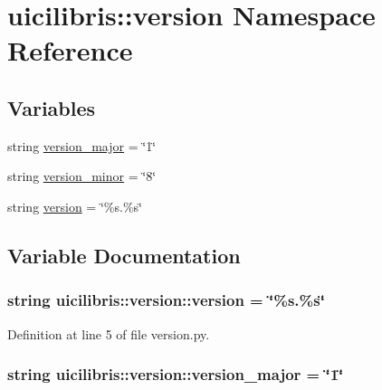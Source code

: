 \hypertarget{namespaceuicilibris_1_1version}{\section{uicilibris\-:\-:version \-Namespace \-Reference}
\label{namespaceuicilibris_1_1version}
}
\subsection*{\-Variables}
\begin{DoxyCompactItemize}
\item 
string \hyperlink{namespaceuicilibris_1_1version_a4b02363ec60fae0cb9598fa91b308e1a}{version\-\_\-major} = \char`\"{}1\char`\"{}
\item 
string \hyperlink{namespaceuicilibris_1_1version_abebe26f12f2b7b3aa2ed3878c6b4848d}{version\-\_\-minor} = \char`\"{}8\char`\"{}
\item 
string \hyperlink{namespaceuicilibris_1_1version_aa28b7695ab2f52dc9b4cb3027d3d6543}{version} = \char`\"{}\%s.\%s\char`\"{}
\end{DoxyCompactItemize}


\subsection{\-Variable \-Documentation}
\hypertarget{namespaceuicilibris_1_1version_aa28b7695ab2f52dc9b4cb3027d3d6543}{
\subsubsection[{version}]{\setlength{\rightskip}{0pt plus 5cm}string {\bf uicilibris\-::version\-::version} = \char`\"{}\%s.\%s\char`\"{}}}\label{namespaceuicilibris_1_1version_aa28b7695ab2f52dc9b4cb3027d3d6543}


\-Definition at line 5 of file version.\-py.

\hypertarget{namespaceuicilibris_1_1version_a4b02363ec60fae0cb9598fa91b308e1a}{
\subsubsection[{version\-\_\-major}]{\setlength{\rightskip}{0pt plus 5cm}string {\bf uicilibris\-::version\-::version\-\_\-major} = \char`\"{}1\char`\"{}}}\label{namespaceuicilibris_1_1version_a4b02363ec60fae0cb9598fa91b308e1a}


